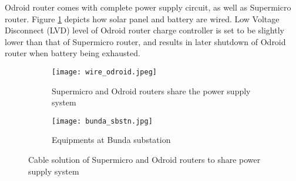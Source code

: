 Odroid router comes with complete power supply circuit, as well as Supermicro router. Figure \ref{wiring} depicts how solar panel and battery are wired. Low Voltage Disconnect (LVD) level of Odroid router charge controller is set to be slightly lower than that of Supermicro router, and results in later shutdown of Odroid router when battery being exhausted.
\begin{figure}[h]
\centering
\begin{subfigure}{0.45\textwidth}
\centering
\texttt{[image: wire\_odroid.jpeg]}
\caption{Supermicro and Odroid routers share the power supply system}
\end{subfigure}
\begin{subfigure}{0.45\textwidth}
\centering
\texttt{[image: bunda\_sbstn.jpg]}
\caption{Equipments at Bunda substation}
\end{subfigure}
\caption{Cable solution of Supermicro and Odroid routers to share power supply system}
\label{wiring}
\end{figure}